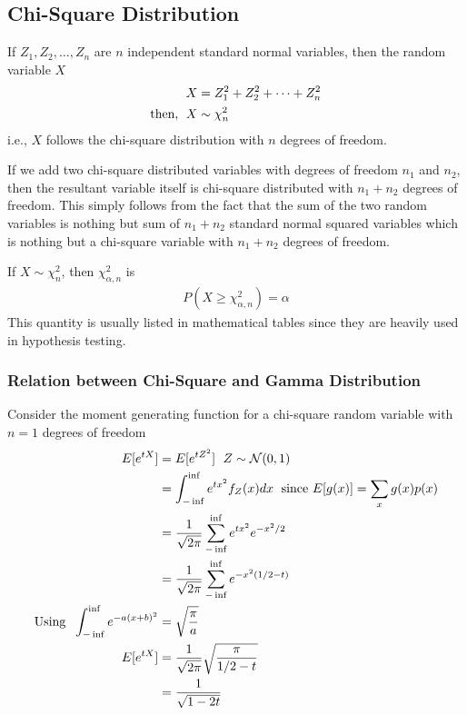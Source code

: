 \documentclass[../probability-notes.tex]{subfiles}
\begin{document}
    \subsection{Chi-Square Distribution}\label{chi_square}
    If $Z_{1}, Z_{2}, \ldots, Z_{n}$ are $n$ independent standard normal variables, then the random variable $X$
    \begin{align*}
        X &= Z_{1}^{2} + Z_{2}^{2} + \cdots + Z_{n}^{2}\\
        \text{then, \;} X &\sim \chi_{n}^{2} 
    \end{align*}
    i.e., $X$ follows the chi-square distribution with $n$ degrees of freedom.\newline

    If we add two chi-square distributed variables with degrees of freedom $n_{1}$ and $n_{2}$, then the resultant variable itself is chi-square distributed with $n_{1} + n_{2}$ degrees of freedom. This simply follows from the fact that the sum of the two random variables is nothing but sum of $n_{1} + n_{2}$ standard normal squared variables which is nothing but a chi-square variable with $n_{1} + n_{2}$ degrees of freedom.\newline

    If $X \sim \chi_{n}^{2}$, then $\chi_{\alpha, n}^{2}$ is
    \begin{align*}
        P(X \geq \chi_{\alpha, n}^{2}) = \alpha
    \end{align*}
    This quantity is usually listed in mathematical tables since they are heavily used in hypothesis testing.\newline

    \subsubsection{Relation between Chi-Square and Gamma Distribution}\label{sec:rel_gamma_chi}
    Consider the moment generating function for a chi-square random variable with $n=1$ degrees of freedom
    \begin{align*}
        E[e^{tX}] &= E[e^{tZ^{2}}] \text{\; $Z \sim \mathcal{N}(0, 1)$}\\
        &= \int_{-\inf}^{\inf} e^{tx^{2}} f_{Z}(x) dx \text{\; since $E[g(x)] = \sum_{x} g(x)p(x)$}\\
        &= \frac{1}{\sqrt{2\pi}} \sum_{-\inf}^{\inf} e^{tx^{2}} e^{-x^{2}/2}\\
        &= \frac{1}{\sqrt{2\pi}} \sum_{-\inf}^{\inf} e^{-x^{2}(1/2 - t)}\\
        \text{Using \;} \int_{-\inf}^{\inf} e^{-a(x+b)^{2}} &= \sqrt{\frac{\pi}{a}}\\
        E[e^{tX}] &= \frac{1}{\sqrt{2\pi}} \sqrt{\frac{\pi}{1/2 - t}}\\
        &= \frac{1}{\sqrt{1 - 2t}}
    \end{align*}
\end{document}
